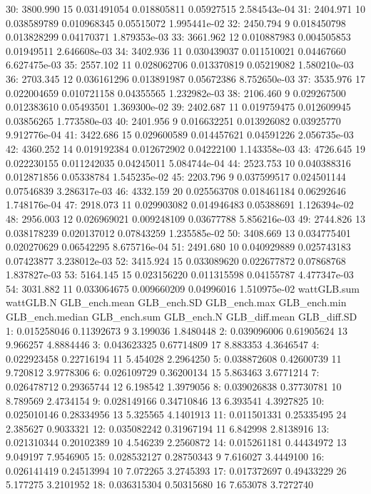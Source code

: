 \documentclass[
  10pt,
  a4paper,oneside]{article}
\begin{document}
30: 3800.990 15 0.031491054 0.018805811 0.05927515 2.584543e-04
31: 2404.971 10 0.038589789 0.010968345 0.05515072 1.995441e-02
32: 2450.794 9 0.018450798 0.013828299 0.04170371 1.879353e-03
33: 3661.962 12 0.010887983 0.004505853 0.01949511 2.646608e-03
34: 3402.936 11 0.030439037 0.011510021 0.04467660 6.627475e-03
35: 2557.102 11 0.028062706 0.013370819 0.05219082 1.580210e-03
36: 2703.345 12 0.036161296 0.013891987 0.05672386 8.752650e-03
37: 3535.976 17 0.022004659 0.010721158 0.04355565 1.232982e-03
38: 2106.460 9 0.029267500 0.012383610 0.05493501 1.369300e-02
39: 2402.687 11 0.019759475 0.012609945 0.03856265 1.773580e-03
40: 2401.956 9 0.016632251 0.013926082 0.03925770 9.912776e-04
41: 3422.686 15 0.029600589 0.014457621 0.04591226 2.056735e-03
42: 4360.252 14 0.019192384 0.012672902 0.04222100 1.143358e-03
43: 4726.645 19 0.022230155 0.011242035 0.04245011 5.084744e-04
44: 2523.753 10 0.040388316 0.012871856 0.05338784 1.545235e-02
45: 2203.796 9 0.037599517 0.024501144 0.07546839 3.286317e-03
46: 4332.159 20 0.025563708 0.018461184 0.06292646 1.748176e-04
47: 2918.073 11 0.029903082 0.014946483 0.05388691 1.126394e-02
48: 2956.003 12 0.026969021 0.009248109 0.03677788 5.856216e-03
49: 2744.826 13 0.038178239 0.020137012 0.07843259 1.235585e-02
50: 3408.669 13 0.034775401 0.020270629 0.06542295 8.675716e-04
51: 2491.680 10 0.040929889 0.025743183 0.07423877 3.238012e-03
52: 3415.924 15 0.033089620 0.022677872 0.07868768 1.837827e-03
53: 5164.145 15 0.023156220 0.011315598 0.04155787 4.477347e-03
54: 3031.882 11 0.033064675 0.009660209 0.04996016 1.510975e-02
wattGLB.sum wattGLB.N GLB\_ench.mean GLB\_ench.SD GLB\_ench.max GLB\_ench.min
GLB\_ench.median GLB\_ench.sum GLB\_ench.N GLB\_diff.mean GLB\_diff.SD
1: 0.015258046 0.11392673 9 3.199036 1.8480448
2: 0.039096006 0.61905624 13 9.966257 4.8884446
3: 0.043623325 0.67714809 17 8.883353 4.3646547
4: 0.022923458 0.22716194 11 5.454028 2.2964250
5: 0.038872608 0.42600739 11 9.720812 3.9778306
6: 0.026109729 0.36200134 15 5.863463 3.6771214
7: 0.026478712 0.29365744 12 6.198542 1.3979056
8: 0.039026838 0.37730781 10 8.789569 2.4734154
9: 0.028149166 0.34710846 13 6.393541 4.3927825
10: 0.025010146 0.28334956 13 5.325565 4.1401913
11: 0.011501331 0.25335495 24 2.385627 0.9033321
12: 0.035082242 0.31967194 11 6.842998 2.8138916
13: 0.021310344 0.20102389 10 4.546239 2.2560872
14: 0.015261181 0.44434972 13 9.049197 7.9546905
15: 0.028532127 0.28750343 9 7.616027 3.4449100
16: 0.026141419 0.24513994 10 7.072265 3.2745393
17: 0.017372697 0.49433229 26 5.177275 3.2101952
18: 0.036315304 0.50315680 16 7.653078 3.7272740
\end{document}
